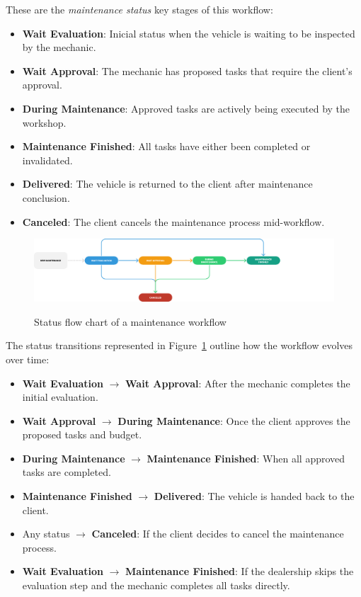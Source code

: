 These are the \textit{maintenance status} key stages of this workflow:
\begin{itemize}
    \item \textbf{Wait Evaluation}: Inicial status when the vehicle is waiting to be inspected by the mechanic.
    \item \textbf{Wait Approval}: The mechanic has proposed tasks that require the client's approval.
    \item \textbf{During Maintenance}: Approved tasks are actively being executed by the workshop.
    \item \textbf{Maintenance Finished}: All tasks have either been completed or invalidated.
    \item \textbf{Delivered}: The vehicle is returned to the client after maintenance conclusion.
    \item \textbf{Canceled}: The client cancels the maintenance process mid-workflow.
\end{itemize}

\begin{figure}[h]
  \caption{Status flow chart of a maintenance workflow}
  \centering
  \includegraphics[width=\textwidth]{figs/Status/Maintenance/StatusDiagram}
  \label{fig:maintenanceFlowChart}
\end{figure}

The status transitions represented in Figure~\ref{fig:maintenanceFlowChart} outline how the workflow evolves over time:
\begin{itemize}
    \item \textbf{Wait Evaluation} $\rightarrow$ \textbf{Wait Approval}: After the mechanic completes the initial evaluation.
    \item \textbf{Wait Approval} $\rightarrow$ \textbf{During Maintenance}: Once the client approves the proposed tasks and budget.
    \item \textbf{During Maintenance} $\rightarrow$ \textbf{Maintenance Finished}: When all approved tasks are completed.
    \item \textbf{Maintenance Finished} $\rightarrow$ \textbf{Delivered}: The vehicle is handed back to the client.
    \item Any status $\rightarrow$ \textbf{Canceled}: If the client decides to cancel the maintenance process.
    \item \textbf{Wait Evaluation} $\rightarrow$ \textbf{Maintenance Finished}: If the dealership skips the evaluation step and the mechanic completes all tasks directly.
\end{itemize}

